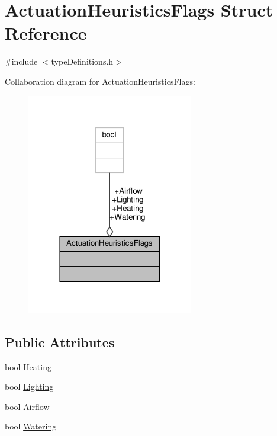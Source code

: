 \hypertarget{structActuationHeuristicsFlags}{}\section{Actuation\+Heuristics\+Flags Struct Reference}
\label{structActuationHeuristicsFlags}


{\ttfamily \#include $<$type\+Definitions.\+h$>$}



Collaboration diagram for Actuation\+Heuristics\+Flags\+:\nopagebreak
\begin{figure}[H]
\begin{center}
\leavevmode
\includegraphics[width=206pt]{structActuationHeuristicsFlags__coll__graph}
\end{center}
\end{figure}
\subsection*{Public Attributes}
\begin{DoxyCompactItemize}
\item 
bool \hyperlink{structActuationHeuristicsFlags_aa591189e4fa9ffbf4dc982c1bb9202b6}{Heating}
\item 
bool \hyperlink{structActuationHeuristicsFlags_a78679bf94f4fbf96995a7942719dd756}{Lighting}
\item 
bool \hyperlink{structActuationHeuristicsFlags_ab9619c202211b7526c881df4746bdafe}{Airflow}
\item 
bool \hyperlink{structActuationHeuristicsFlags_a8c6dac59a730c899598d52dc2bec082f}{Watering}
\end{DoxyCompactItemize}


